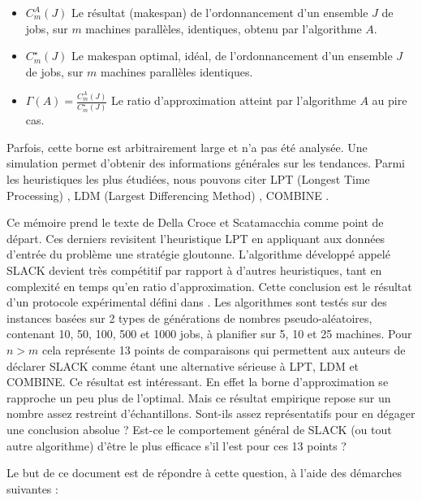 \documentclass[a4paper,12pt]{report}
\theoremstyle{plain}				%
\theoremstyle{definition}				%
\newcommand\dcs{Della Croce et Scatamacchia\xspace}
\begin{document}
\begin{itemize}
\item $C_m^A(J)$ Le résultat (makespan) de l'ordonnancement
	d'un ensemble $J$ de jobs,
	sur $m$ machines parallèles, identiques,
	obtenu par l'algorithme $A$.
\item $C_m^\star(J)$ Le makespan optimal, idéal, de l'ordonnancement
	d'un ensemble $J$ de jobs,
	sur $m$ machines parallèles identiques.
\item $\Gamma(A)=\frac{C_m^A(J)}{C_m^\star(J)}$
	Le ratio d'approximation atteint par l'algorithme $A$ au pire cas.
\end{itemize}
   
Parfois, cette borne est arbitrairement large et n'a pas été analysée. Une simulation permet d'obtenir des 
  informations générales sur les tendances.
Parmi les heuristiques les plus étudiées, nous pouvons citer 
  LPT (Longest Time Processing) \cite{graham1966bounds}, 
  LDM (Largest Differencing Method) \cite{karmarkar1982differencing}, 
  COMBINE \cite{lee1988multiprocessor}.
  
\bigskip
Ce mémoire prend le texte de \dcs \cite{della2020longest} comme point de départ.    
Ces derniers revisitent l'heuristique LPT en appliquant aux données d'entrée du problème une stratégie gloutonne. 
L'algorithme développé appelé SLACK devient très compétitif par rapport à d'autres heuristiques, 
  tant en complexité en temps qu'en ratio d'approximation. 
Cette conclusion est le résultat d'un protocole expérimental défini dans \cite{iori2008scatter}. 
Les algorithmes sont testés sur des instances basées sur 2 types de générations de nombres pseudo-aléatoires, contenant 10, 50, 100, 500 et 1000 jobs, à planifier sur 5, 10 et 25 machines. 
Pour $n > m$ cela représente 13 points de comparaisons qui permettent aux auteurs de déclarer SLACK comme étant une alternative sérieuse à LPT, LDM et COMBINE. 
Ce résultat est intéressant. En effet la borne d'approximation se rapproche un peu plus de l'optimal. 
Mais ce résultat empirique repose sur un nombre assez restreint d'échantillons. Sont-ils assez représentatifs pour en dégager une conclusion absolue ? Est-ce le comportement général de SLACK (ou tout autre algorithme) d'être le plus efficace s'il l'est pour ces 13 points ? 

Le but de ce document est de répondre à cette question, à l'aide des démarches suivantes :
\end{document}
